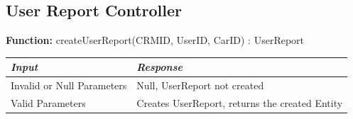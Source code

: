 \documentclass[a4paper]{article}
\begin{document}
\subsection{User Report Controller}
\textbf{Function:} createUserReport(CRMID, UserID, CarID) : UserReport \par
\begin{center}
\begin{tabular}{ | L{6cm} | L{6cm} | }
\hline
	\textit{Input}& \textit{Response}\\ \hline
	Invalid or Null Parameters & Null, UserReport not created \\ \hline
	Valid Parameters & Creates UserReport, returns the created Entity\\ \hline
\end{tabular}
\end{center}
\end{document}
